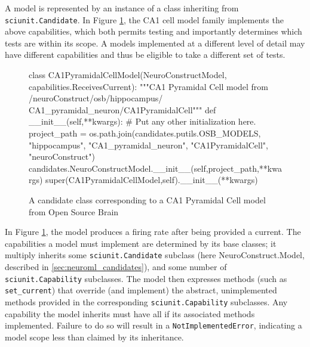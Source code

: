 \documentclass[11pt,letterpaper]{article}
\begin{document}
A model is represented by an instance of a class inheriting from \verb|sciunit.Candidate|.  In Figure \ref{fig:ca1_model}, the CA1 cell model family implements the above capabilities, which both permits testing and importantly determines which tests are within its scope.  A models implemented at a different level of detail may have different capabilities and thus be eligible to take a different set of tests.  

\begin{figure}
\caption{A candidate class corresponding to a CA1 Pyramidal Cell model from Open Source Brain}
\label{fig:ca1_model}
\begin{python}
class CA1PyramidalCellModel(NeuroConstructModel,
				            capabilities.ReceivesCurrent):
	"""CA1 Pyramidal Cell model from /neuroConstruct/osb/hippocampus/
	CA1_pyramidal_neuron/CA1PyramidalCell"""
	def __init__(self,**kwargs):
		# Put any other initialization here.
		project_path = os.path.join(candidates.putils.OSB_MODELS,
									"hippocampus",
									"CA1_pyramidal_neuron",
									"CA1PyramidalCell",
									"neuroConstruct")
		candidates.NeuroConstructModel.__init__(self,project_path,**kwargs)
		super(CA1PyramidalCellModel,self).__init__(**kwargs)
\end{python}
\vspace{-18px}
\end{figure}

In Figure \ref{fig:ca1_model}, the model produces a firing rate after being provided a current.  The capabilities a model must implement are determined by its base classes; it multiply inherits some \verb|sciunit.Candidate| subclass (here NeuroConstruct.Model, described in \ref{sec:neuroml_candidates}), and some number of \verb|sciunit.Capability| subclasses.  The model then expresses methods (such as \verb|set_current|) that override (and implement) the abstract, unimplemented methods provided in the corresponding \verb|sciunit.Capability| subclasses.  Any capability the model inherits must have all if its associated methods implemented.  Failure to do so will result in a \verb|NotImplementedError|, indicating a model scope less than claimed by its inheritance.  
\end{document}
